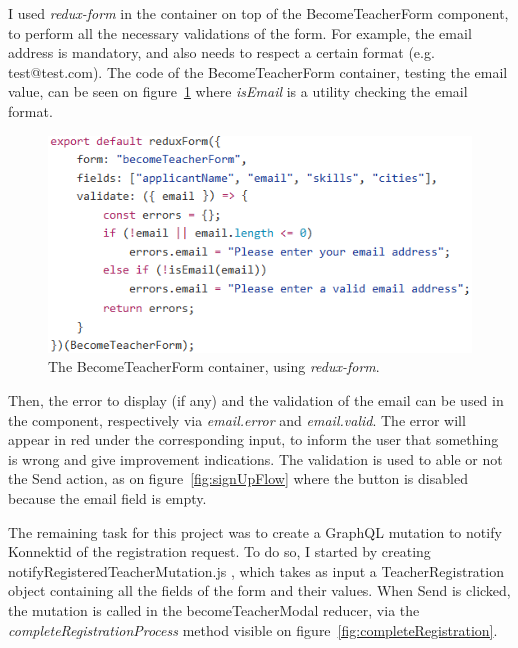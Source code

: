 I used \textit{redux-form} in the container on top of the \guillemotleft{} BecomeTeacherForm \guillemotright{} component, to perform all the necessary validations of the form. For example, the email address is mandatory, and also needs to respect a certain format (e.g. test@test.com). The code of the \guillemotleft{} BecomeTeacherForm \guillemotright{} container, testing the email value, can be seen on {\sc figure}~\ref{fig:reduxForm} where \textit{isEmail} is a utility checking the email format.

 \begin{figure}[H]
    \centering
    \includegraphics{figure/reduxForm.png}
    \caption{The \guillemotleft{} BecomeTeacherForm \guillemotright{} container, using \textit{redux-form}.}
    \label{fig:reduxForm}
\end{figure}

Then, the error to display (if any) and the validation of the email can be used in the component, respectively via \textit{email.error} and \textit{email.valid}. The error will appear in red under the corresponding input, to inform the user that something is wrong and give improvement indications. The validation is used to able or not the \guillemotleft{} Send \guillemotright{} action, as on {\sc figure}~\ref{fig:signUpFlow} where the button is disabled because the email field is empty.

The remaining task for this project was to create a GraphQL mutation to notify Konnektid of the registration request. To do so, I started by creating \guillemotleft{} notifyRegisteredTeacherMutation.js \guillemotright{}, which takes as input a \guillemotleft{} TeacherRegistration \guillemotright{} object containing all the fields of the form and their values. When \guillemotleft{} Send \guillemotright{} is clicked, the mutation is called in the \guillemotleft{} becomeTeacherModal \guillemotright{} reducer, via the \textit{completeRegistrationProcess} method visible on {\sc figure}~\ref{fig:completeRegistration}.

